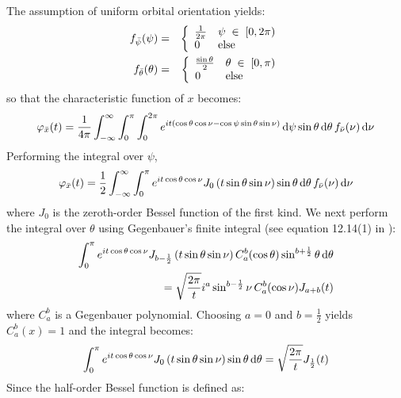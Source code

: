 The assumption of uniform orbital orientation yields:
\begin{eqnarray}
f_{\bar\psi}(\psi) &=& \left\{
    \begin{array}{l l}
    \frac{1}{2 \pi} & \psi \; \in \; [0, 2\pi) \\
    0 & \mathrm{else}
    \end{array}
    \right. \label{eq:psipdf}\\
f_{\bar\theta}(\theta) &=& \left\{
    \begin{array}{l l}
    \frac{\sin{\theta}}{2} & \theta \; \in \; [0, \pi) \\
    0 & \mathrm{else}
    \end{array}
        \right. \label{eq:thetapdf}
\end{eqnarray}
so that the characteristic function of $x$ becomes:
\begin{equation}
\varphi_{\bar{x}}(t)  = \frac{1}{4 \pi}\int_{-\infty}^{\infty} \int_{0}^{\pi} \int_{0}^{2 \pi}  e^{i t (\cos{\theta}\cos{\nu}- \cos{\psi}\sin{\theta}\sin{\nu})}\,\mathrm{d}\psi \sin{\theta} \,\mathrm{d}\theta\, f_{\bar\nu}(\nu) \,\mathrm{d}\nu
\end{equation}
Performing the integral over $\psi$,
\begin{equation}
    \varphi_{\bar{x}}(t)  = \frac{1}{2}\int_{-\infty}^{\infty} \int_{0}^{\pi}  e^{i t \cos{\theta}\cos{\nu}}  J_{0}\left(t \sin{\theta}\sin{\nu}\right)  \sin{\theta} \,\mathrm{d}\theta\, f_{\bar\nu}(\nu) \,\mathrm{d}\nu
\end{equation}
where $J_0$ is the zeroth-order Bessel function of the first kind.
We next perform the integral over $\theta$ using Gegenbauer's finite integral (see equation 12.14(1) in \citet{watson1944treatise}):
\begin{align}
    \int_0^{\pi}  e^{i t \cos{\theta}\cos{\nu}} J_{b-\frac{1}{2}}\left(t \sin{\theta}\sin{\nu}\right) C_a^b{(\cos{\theta})} \sin^{b+\frac{1}{2}}{\theta} \,\mathrm{d}\theta \nonumber\\
     = \sqrt{\frac{2 \pi}{t}} i^a \sin^{b-\frac{1}{2}}{\nu} \, C_a^b{(\cos{\nu})} J_{a+b}(t)
\end{align}
where $C_a^b$ is a Gegenbauer polynomial.  Choosing $a = 0$ and $b = \frac{1}{2}$ yields $C_a^b(x) = 1$ and the integral becomes:
\begin{equation}
    \int_0^{\pi} e^{i t \cos{\theta}\cos{\nu}} J_{0}\left(t \sin{\theta}\sin{\nu}\right) \sin{\theta} \,\mathrm{d}\theta = \sqrt{\frac{2 \pi}{t}} J_{\frac{1}{2}}(t)
\end{equation}
Since the half-order Bessel function is defined as:
